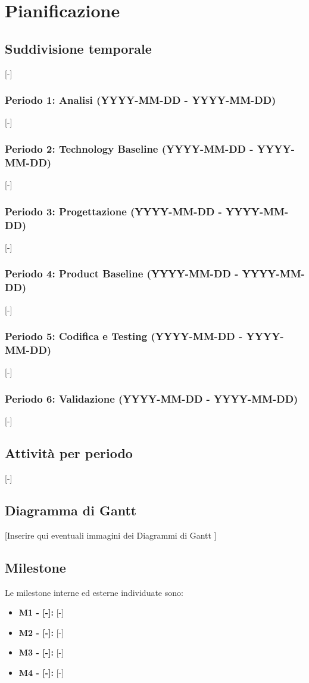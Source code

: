 \section{Pianificazione}

\subsection{Suddivisione temporale}
[-]

\subsubsection{Periodo 1: Analisi (YYYY-MM-DD - YYYY-MM-DD)}
[-]

\subsubsection{Periodo 2: Technology Baseline (YYYY-MM-DD - YYYY-MM-DD)}
[-]

\subsubsection{Periodo 3: Progettazione (YYYY-MM-DD - YYYY-MM-DD)}
[-]

\subsubsection{Periodo 4: Product Baseline (YYYY-MM-DD - YYYY-MM-DD)}
[-]

\subsubsection{Periodo 5: Codifica e Testing (YYYY-MM-DD - YYYY-MM-DD)}
[-]

\subsubsection{Periodo 6: Validazione (YYYY-MM-DD - YYYY-MM-DD)}
[-]

\subsection{Attività per periodo}
[-]

\subsection{Diagramma di Gantt}
{[Inserire qui eventuali immagini dei Diagrammi di Gantt ]}

\subsection{Milestone}
Le milestone interne ed esterne individuate sono:
\begin{itemize}
	\item \textbf{M1 - [-]:} [-]
	\item \textbf{M2 - [-]:} [-]
	\item \textbf{M3 - [-]:} [-]
	\item \textbf{M4 - [-]:} [-]
\end{itemize}